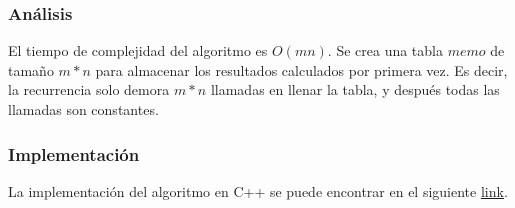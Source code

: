 \subsubsection*{Análisis}
El tiempo de complejidad del algoritmo es $O(mn)$. Se crea una tabla $memo$ de tamaño $m*n$ para almacenar los resultados calculados por primera vez. Es decir, la recurrencia solo demora $m*n$ llamadas en llenar la tabla, y después todas las llamadas son constantes. 

\subsubsection*{Implementación}
La implementación del algoritmo en C++ se puede encontrar en el siguiente \href{https://github.com/Guillermo598/ProyectoADA/blob/master/Pregunta4.cpp}{link}.